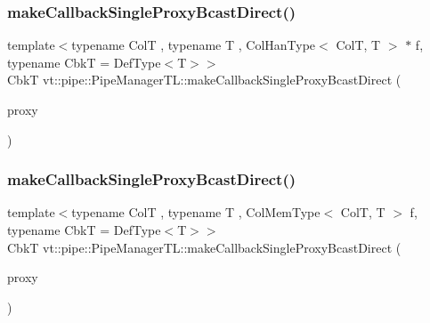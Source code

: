 \subsubsection{\texorpdfstring{make\+Callback\+Single\+Proxy\+Bcast\+Direct()}{makeCallbackSingleProxyBcastDirect()}\hspace{0.1cm}{\footnotesize\ttfamily [1/3]}}
{\footnotesize\ttfamily template$<$typename ColT , typename T , Col\+Han\+Type$<$ Col\+T, T $>$ $\ast$ f, typename CbkT  = Def\+Type$<$\+T$>$$>$ \\
CbkT vt\+::pipe\+::\+Pipe\+Manager\+T\+L\+::make\+Callback\+Single\+Proxy\+Bcast\+Direct (\begin{DoxyParamCaption}\item[{\hyperlink{structvt_1_1pipe_1_1_pipe_manager_t_l_af56c58cad882496e35f01227d4da3898}{Col\+Proxy\+Type}$<$ ColT $>$}]{proxy }\end{DoxyParamCaption})}

\mbox{\label{structvt_1_1pipe_1_1_pipe_manager_t_l_aff70024da9ee15ef2c935ca21d18a80d}} 
\subsubsection{\texorpdfstring{make\+Callback\+Single\+Proxy\+Bcast\+Direct()}{makeCallbackSingleProxyBcastDirect()}\hspace{0.1cm}{\footnotesize\ttfamily [2/3]}}
{\footnotesize\ttfamily template$<$typename ColT , typename T , Col\+Mem\+Type$<$ Col\+T, T $>$ f, typename CbkT  = Def\+Type$<$\+T$>$$>$ \\
CbkT vt\+::pipe\+::\+Pipe\+Manager\+T\+L\+::make\+Callback\+Single\+Proxy\+Bcast\+Direct (\begin{DoxyParamCaption}\item[{\hyperlink{structvt_1_1pipe_1_1_pipe_manager_t_l_af56c58cad882496e35f01227d4da3898}{Col\+Proxy\+Type}$<$ ColT $>$}]{proxy }\end{DoxyParamCaption})}

\mbox{\label{structvt_1_1pipe_1_1_pipe_manager_t_l_a41fec001a4e698cb2bac888a6a48d606}} 
